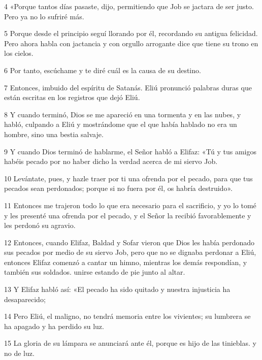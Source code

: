 \par 4 «Porque tantos días pasaste, dijo, permitiendo que Job se jactara de ser justo. Pero ya no lo sufriré más.

\par 5 Porque desde el principio seguí llorando por él, recordando su antigua felicidad. Pero ahora habla con jactancia y con orgullo arrogante dice que tiene su trono en los cielos.

\par 6 Por tanto, escúchame y te diré cuál es la causa de su destino.

\par 7 Entonces, imbuido del espíritu de Satanás. Eliú pronunció palabras duras que están escritas en los registros que dejó Eliú.

\par 8 Y cuando terminó, Dios se me apareció en una tormenta y en las nubes, y habló, culpando a Eliú y mostrándome que el que había hablado no era un hombre, sino una bestia salvaje.

\par 9 Y cuando Dios terminó de hablarme, el Señor habló a Elifaz: «Tú y tus amigos habéis pecado por no haber dicho la verdad acerca de mi siervo Job.

\par 10 Levántate, pues, y hazle traer por ti una ofrenda por el pecado, para que tus pecados sean perdonados; porque si no fuera por él, os habría destruido».

\par 11 Entonces me trajeron todo lo que era necesario para el sacrificio, y yo lo tomé y les presenté una ofrenda por el pecado, y el Señor la recibió favorablemente y les perdonó su agravio.

\par 12 Entonces, cuando Elifaz, Baldad y Sofar vieron que Dios les había perdonado sus pecados por medio de su siervo Job, pero que no se dignaba perdonar a Eliú, entonces Elifaz comenzó a cantar un himno, mientras los demás respondían, y también sus soldados. unirse estando de pie junto al altar.

\par 13 Y Elifaz habló así: «El pecado ha sido quitado y nuestra injusticia ha desaparecido;

\par 14 Pero Eliú, el maligno, no tendrá memoria entre los vivientes; su lumbrera se ha apagado y ha perdido su luz.

\par 15 La gloria de su lámpara se anunciará ante él, porque es hijo de las tinieblas. y no de luz.

